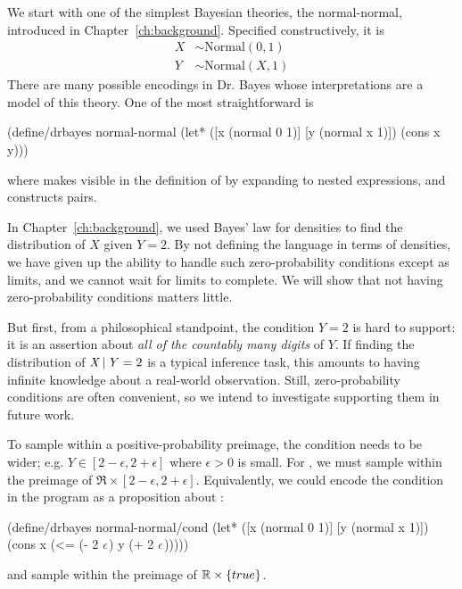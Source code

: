 We start with one of the simplest Bayesian theories, the normal-normal, introduced in Chapter~\ref{ch:background}.
Specified constructively, it is
\begin{equation}
\begin{aligned}
	X &\sim \mathrm{Normal}(0,1) \\
	Y &\sim \mathrm{Normal}(X,1)
\end{aligned}
\end{equation}
There are many possible encodings in Dr. Bayes whose interpretations are a model of this theory.
One of the most straightforward is
\begin{center}\singlespacing
\begin{schemedisplay}
(define/drbayes normal-normal
  (let* ([x  (normal 0 1)]
         [y  (normal x 1)])
    (cons x y)))
\end{schemedisplay}
\end{center}
where  makes  visible in the definition of  by expanding to nested  expressions, and  constructs pairs.

In Chapter~\ref{ch:background}, we used Bayes' law for densities to find the distribution of $\mathit{X}$ given $\mathit{Y} = 2$.
By not defining the language in terms of densities, we have given up the ability to handle such zero-probability conditions except as limits, and we cannot wait for limits to complete.
We will show that not having zero-probability conditions matters little.

But first, from a philosophical standpoint, the condition $\mathit{Y} = 2$ is hard to support: it is an assertion about \emph{all of the countably many digits} of $\mathit{Y}$.
If finding the distribution of $\mathit{X} \,|\, \mathit{Y} = 2$ is a typical inference task, this amounts to having infinite knowledge about a real-world observation.
Still, zero-probability conditions are often convenient, so we intend to investigate supporting them in future work.

To sample within a positive-probability preimage, the condition needs to be wider; e.g. $\mathit{Y} \in [2-\epsilon,2+\epsilon]$ where $\epsilon > 0$ is small.
For , we must sample within the preimage of $\Re \times [2-\epsilon,2+\epsilon]$.
Equivalently, we could encode the condition in the program as a proposition about :
\begin{center}\singlespacing
\begin{schemedisplay}
(define/drbayes normal-normal/cond
  (let* ([x  (normal 0 1)]
         [y  (normal x 1)])
    (cons x (<= (- 2 $\va{\epsilon}$) y (+ 2 $\va{\epsilon}$)))))
\end{schemedisplay}
\end{center}
and sample within the preimage of $\mathbb{R} \times \{{true}\}$.

